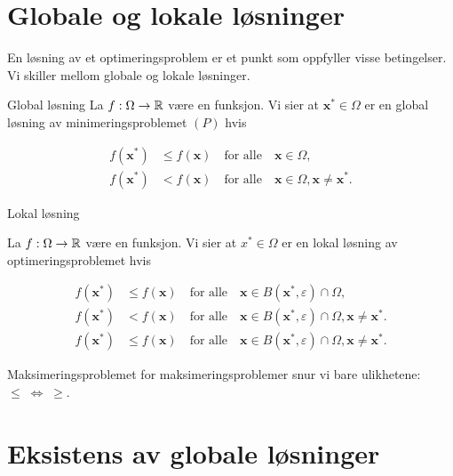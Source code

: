 \section{Globale og lokale løsninger}

En løsning av et optimeringsproblem er et punkt som oppfyller visse betingelser.
Vi skiller mellom globale og lokale løsninger.

\begin{definition}{Global løsning}{}
  La \(f: \Omega \to \mathbb{R}\) være en funksjon. Vi sier at \(\symbf{x}^* \in \Omega\) er en global løsning av minimeringsproblemet \((P)\) hvis

  \begin{align*}
    f(\symbf{x}^*) & \leq f(\symbf{x}) \quad \text{for alle} \quad \symbf{x} \in \Omega, \tag{Global løsning}                                 \\
    f(\symbf{x}^*) & < f(\symbf{x}) \quad \text{for alle} \quad \symbf{x} \in \Omega, \symbf{x} \neq \symbf{x}^*. \tag{Streng global løsning}
  \end{align*}
\end{definition}

\begin{definition}{Lokal løsning}{}

  La \(f: \Omega \to \mathbb{R}\) være en funksjon. Vi sier at \(x^* \in \Omega\) er en lokal løsning av optimeringsproblemet hvis

  \begin{align*}
    f(\symbf{x}^*) & \leq f(\symbf{x}) \quad \text{for alle} \quad \symbf{x} \in B(\symbf{x}^*, \varepsilon) \cap \Omega, \tag{Lokal løsning}                                     \\
    f(\symbf{x}^*) & < f(\symbf{x}) \quad \text{for alle} \quad \symbf{x} \in B(\symbf{x}^*, \varepsilon) \cap \Omega, \symbf{x} \neq \symbf{x}^*. \tag{Streng lokal løsning}     \\
    f(\symbf{x}^*) & \leq f(\symbf{x}) \quad \text{for alle} \quad \symbf{x} \in B(\symbf{x}^*, \varepsilon) \cap \Omega, \symbf{x} \neq \symbf{x}^*. \tag{Isolert lokal løsning}
  \end{align*}
\end{definition}

\begin{remark}{Maksimeringsproblemet}{}
  for maksimeringsproblemer snur vi bare ulikhetene: \(\leq \; \Leftrightarrow \; \geq\).
\end{remark}

\section*{Eksistens av globale løsninger}


